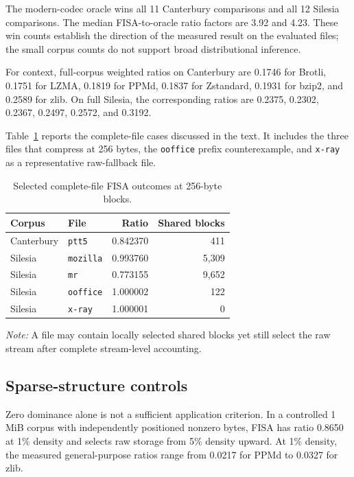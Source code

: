 \documentclass[a4paper,fleqn]{cas-dc}
\newcommand{\tablenote}[1]{%
  \par\smallskip
  \begin{minipage}{0.98\linewidth}
  \footnotesize\textit{Note:} #1
  \end{minipage}}
\begin{document}
The modern-codec oracle wins all 11 Canterbury comparisons and all 12 Silesia
comparisons. The median FISA-to-oracle ratio factors are 3.92 and 4.23.
These win counts establish the direction of the measured result on the
evaluated files; the small corpus counts do not support broad distributional
inference.

For context, full-corpus weighted ratios on Canterbury are 0.1746 for Brotli,
0.1751 for LZMA, 0.1819 for PPMd, 0.1837 for Zstandard, 0.1931 for bzip2, and
0.2589 for zlib. On full Silesia, the corresponding ratios are 0.2375,
0.2302, 0.2367, 0.2497, 0.2572, and 0.3192.

Table~\ref{tab:notable-files} reports the complete-file cases discussed in the
text. It includes the three files that compress at 256 bytes, the
\texttt{ooffice} prefix counterexample, and \texttt{x-ray} as a representative
raw-fallback file.

\begin{table}[t]
\caption{Selected complete-file FISA outcomes at 256-byte blocks.}
\label{tab:notable-files}
\centering
\begin{tabular}{llrr}
\toprule
Corpus & File & Ratio & Shared blocks\\
\midrule
Canterbury & \texttt{ptt5}    & 0.842370 & 411\\
Silesia    & \texttt{mozilla} & 0.993760 & 5,309\\
Silesia    & \texttt{mr}      & 0.773155 & 9,652\\
Silesia    & \texttt{ooffice} & 1.000002 & 122\\
Silesia    & \texttt{x-ray}   & 1.000001 & 0\\
\bottomrule
\end{tabular}
\tablenote{A file may contain locally selected shared blocks yet still select
the raw stream after complete stream-level accounting.}
\end{table}

\subsection{Sparse-structure controls}

Zero dominance alone is not a sufficient application criterion. In a
controlled 1\,MiB corpus with independently positioned nonzero bytes, FISA
has ratio 0.8650 at 1\% density and selects raw storage from 5\% density
upward. At 1\% density, the measured general-purpose ratios range from 0.0217
for PPMd to 0.0327 for zlib.
\end{document}

